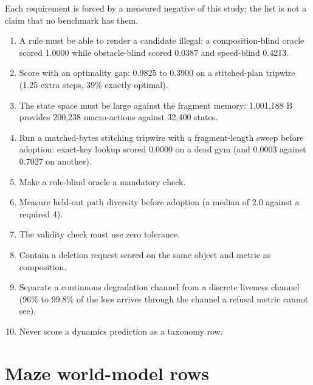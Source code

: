 \documentclass{article} %
\begin{document}
Each requirement is forced by a measured negative of this study; the list is not a claim that
no benchmark has them. %
\begin{enumerate}[leftmargin=*,itemsep=1pt]
\item A rule must be able to render a candidate illegal: a composition-blind oracle scored 1.0000
  while obstacle-blind scored 0.0387 and speed-blind 0.4213. %
\item Score with an optimality gap: 0.9825 to 0.3900 on a stitched-plan tripwire (1.25 extra steps,
  39\% exactly optimal). %
\item The state space must be large against the fragment memory: 1,001,188 B provides 200,238
  macro-actions against 32,400 states. %
\item Run a matched-bytes stitching tripwire with a fragment-length sweep before adoption: exact-key
  lookup scored 0.0000 on a dead gym (and 0.0003 against 0.7027 on another).
\item Make a rule-blind oracle a mandatory check.
\item Measure held-out path diversity before adoption (a median of 2.0 against a required 4).
\item The validity check must use zero tolerance.
\item Contain a deletion request scored on the same object and metric as composition.
\item Separate a continuous degradation channel from a discrete liveness channel (96\% to 99.8\% of
  the loss arrives through the channel a refusal metric cannot see). %
\item Never score a dynamics prediction as a taxonomy row.
\end{enumerate}

\section{Maze world-model rows}
\label{app:mazewm}
\end{document}
